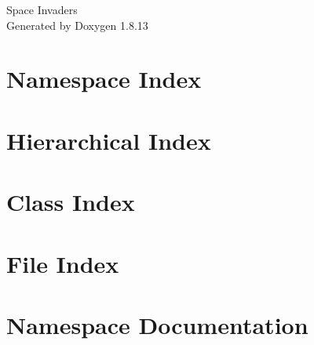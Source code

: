 \documentclass[twoside]{book}
\newcommand{\+}{\discretionary{\mbox{\scriptsize$\hookleftarrow$}}{}{}}
\newcommand{\clearemptydoublepage}{%
  \newpage{\pagestyle{empty}\cleardoublepage}%
}
\begin{document}
\hypersetup{pageanchor=false,
             bookmarksnumbered=true,
             pdfencoding=unicode
            }
\begin{titlepage}
\vspace*{7cm}
\begin{center}%
{\Large Space Invaders }\\
\vspace*{1cm}
{\large Generated by Doxygen 1.8.13}\\
\end{center}
\end{titlepage}
\clearemptydoublepage
{}
\tableofcontents
\clearemptydoublepage
{}
\hypersetup{pageanchor=true}

\chapter{Namespace Index}

\chapter{Hierarchical Index}

\chapter{Class Index}

\chapter{File Index}

\chapter{Namespace Documentation}











\end{document}
